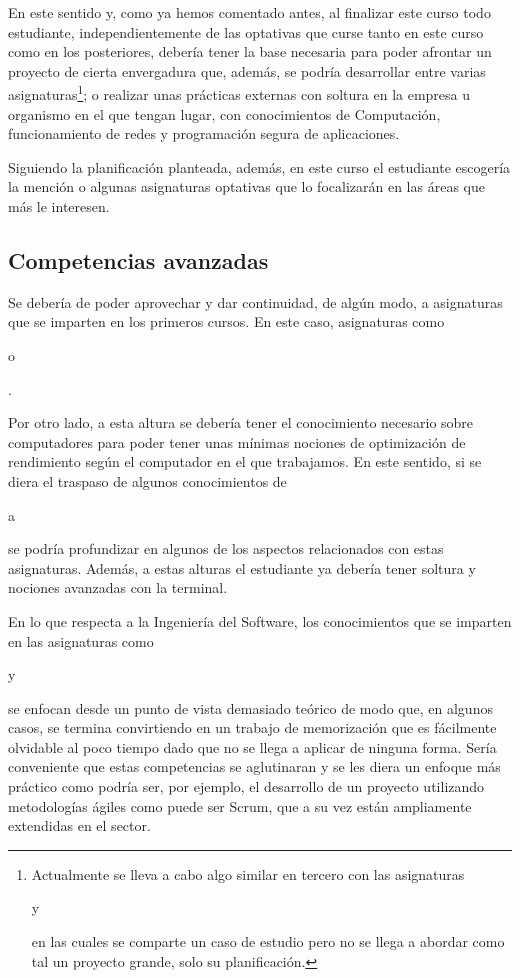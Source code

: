 En este sentido y, como ya hemos comentado antes,
al finalizar este curso todo estudiante,
independientemente de las optativas que curse
tanto en este curso como en los posteriores,
debería tener la base necesaria para
poder afrontar un proyecto de cierta envergadura que, además,
se podría desarrollar entre varias asignaturas\footnote{
    Actualmente se lleva a cabo algo similar en tercero con las asignaturas
    \subject{Procesos de Desarrollo Software} y
    \subject{Gestión de Procesos de Desarrollo Software}
    en las cuales se comparte un caso de estudio pero
    no se llega a abordar como tal un proyecto grande, solo su planificación.
}; o realizar unas prácticas externas con soltura en la empresa u organismo
en el que tengan lugar,
con conocimientos de Computación,
funcionamiento de redes y
programación segura de aplicaciones.

Siguiendo la planificación planteada, además,
en este curso el estudiante escogería la mención o
algunas asignaturas optativas
que lo focalizarán en las áreas que más le interesen.

\subsection{Competencias avanzadas}

Se debería de poder aprovechar y dar continuidad, de algún modo,
a asignaturas que se imparten en los primeros cursos.
En este caso, asignaturas como \subject{Estadística} o \subject{Bases de Datos}.

Por otro lado, a esta altura se debería tener
el conocimiento necesario sobre computadores para
poder tener unas mínimas nociones de optimización de rendimiento
según el computador en el que trabajamos.
En este sentido, si se diera el traspaso de algunos conocimientos de
\subject{Arquitectura y Organización de Computadores} a
\subject{Ampliación de Estructura de Computadores}
se podría profundizar en algunos de los aspectos
relacionados con estas asignaturas.
Además, a estas alturas el estudiante ya debería tener
soltura y nociones avanzadas con la terminal.

En lo que respecta a la Ingeniería del Software,
los conocimientos que se imparten en las asignaturas como
\subject{Procesos de Desarrollo Software} y
\subject{Gestión de Proyectos de Desarrollo de Software}
se enfocan desde un punto de vista demasiado teórico de modo que,
en algunos casos,
se termina convirtiendo en un trabajo de memorización que
es fácilmente olvidable al poco tiempo
dado que no se llega a aplicar de ninguna forma.
Sería conveniente que estas competencias se aglutinaran y
se les diera un enfoque más práctico como podría ser, por ejemplo,
el desarrollo de un proyecto utilizando
metodologías ágiles como puede ser Scrum,
que a su vez están ampliamente extendidas en el sector.

